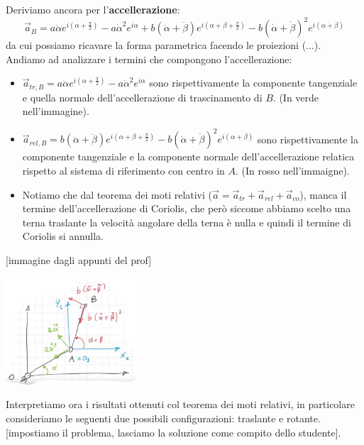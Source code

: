 Deriviamo ancora per l'\textbf{accellerazione}:
\[
    \vec{a}_B = a \ddot{\alpha} e^{i(\alpha + \frac{\pi}{2})} - a \dot{\alpha}^2 e^{i \alpha} + b (\ddot{\alpha} + \ddot{\beta})e^{i(\alpha + \beta + \frac{\pi}{2})} - b (\dot{\alpha} + \dot{\beta})^2 e^{i(\alpha + \beta)}
\]
da cui possiamo ricavare la forma parametrica facendo le proiezioni (...).\newline
\newline
Andiamo ad analizzare i termini che compongono l'accellerazione:
\begin{itemize}
    \item $\vec{a}_{tr,B} = a \ddot{\alpha} e^{i(\alpha + \frac{\pi}{2})} - a \dot{\alpha}^2 e^{i \alpha}$ sono rispettivamente la componente tangenziale e quella normale dell'accellerazione di trascinamento di $B$. (In verde nell'immagine).
    \item $\vec{a}_{rel,B} = b (\ddot{\alpha} + \ddot{\beta})e^{i(\alpha + \beta + \frac{\pi}{2})} - b (\dot{\alpha} + \dot{\beta})^2 e^{i(\alpha + \beta)}$ sono rispettivamente la componente tangenziale e la componente normale dell'accellerazione relatica rispetto al sistema di riferimento con centro in $A$. (In rosso nell'immaigne).
    \item Notiamo che dal teorema dei moti relativi ($\vec{a} = \vec{a}_{tr} + \vec{a}_{rel} + \vec{a}_{co}$), manca il termine dell'accellerazione di Coriolis, che però siccome abbiamo scelto una terna traslante la velocità angolare della terna è nulla e quindi il termine di Coriolis si annulla.
\end{itemize}
[immagine dagli appunti del prof]
\begin{center}
    \includegraphics[height=4cm]{../lezione4/img11.JPG}
\end{center}
Interpretiamo ora i risultati ottenuti col teorema dei moti relativi, in particolare consideriamo le seguenti due possibili configurazioni: traslante e rotante. [impostiamo il problema, lasciamo la soluzione come compito dello studente].
